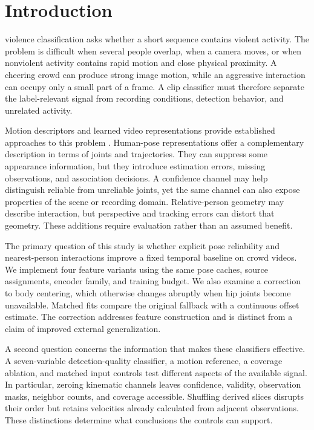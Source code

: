 \section{Introduction}
 violence classification asks whether a short sequence contains violent activity. The problem is difficult when several people overlap, when a camera moves, or when nonviolent activity contains rapid motion and close physical proximity. A cheering crowd can produce strong image motion, while an aggressive interaction can occupy only a small part of a frame. A clip classifier must therefore separate the label-relevant signal from recording conditions, detection behavior, and unrelated activity.

Motion descriptors and learned video representations provide established approaches to this problem \cite{hassner2012,nievas2011,serrano2015,cheng2020}. Human-pose representations offer a complementary description in terms of joints and trajectories. They can suppress some appearance information, but they introduce estimation errors, missing observations, and association decisions. A confidence channel may help distinguish reliable from unreliable joints, yet the same channel can also expose properties of the scene or recording domain. Relative-person geometry may describe interaction, but perspective and tracking errors can distort that geometry. These additions require evaluation rather than an assumed benefit.

The primary question of this study is whether explicit pose reliability and nearest-person interactions improve a fixed temporal baseline on crowd videos. We implement four feature variants using the same pose caches, source assignments, encoder family, and training budget. We also examine a correction to body centering, which otherwise changes abruptly when hip joints become unavailable. Matched fits compare the original fallback with a continuous offset estimate. The correction addresses feature construction and is distinct from a claim of improved external generalization.

A second question concerns the information that makes these classifiers effective. A seven-variable detection-quality classifier, a motion reference, a coverage ablation, and matched input controls test different aspects of the available signal. In particular, zeroing kinematic channels leaves confidence, validity, observation masks, neighbor counts, and coverage accessible. Shuffling derived slices disrupts their order but retains velocities already calculated from adjacent observations. These distinctions determine what conclusions the controls can support.

